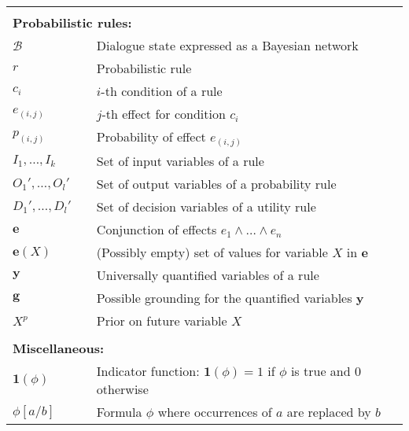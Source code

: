 \begin{longtable}{lp{5mm}p{95mm}}
&&  \vspace{3mm} \\
\multicolumn{3}{l}{\textbf{Probabilistic rules:}} \vspace{2mm} \\
$\mathcal{B}$ && Dialogue state expressed as a Bayesian network \\
$r$ && Probabilistic rule \\
$c_i$ && $i$-th condition of a rule \\
$e_{(i,j)}$ && $j$-th effect for condition $c_i$ \\
$p_{(i,j)}$ && Probability of effect $e_{(i,j)}$ \\
$I_1, \dots, I_{k}$  && Set of input variables of a rule\\
$O_1', \dots, O_{l}'$ && Set of output variables of a probability rule \\
$D_1', \dots, D_{l}'$ && Set of decision variables of a utility rule \\
$\mathbf{e}$ && Conjunction of effects $e_1 \land \dots \land e_n$ \\
$\mathbf{e}(X)$ && (Possibly empty) set of values for variable $X$ in $\mathbf{e}$ \\
$\mathbf{y}$ && Universally quantified variables of a rule  \\
$\mathbf{g}$ && Possible grounding for the quantified variables $\mathbf{y}$ \\
$X^p$ && Prior on future variable $X$ \\
&&  \vspace{3mm} \\
\multicolumn{3}{l}{\textbf{Miscellaneous:}} \vspace{2mm} \\
$\mathbf{1}(\phi)$ && Indicator function: $\mathbf{1}(\phi)\!=\!1$ if $\phi$ is true and 0 otherwise \\
$\phi[a / b]$ && Formula $\phi$ where occurrences of $a$ are replaced by $b$ \\
\end{longtable}
